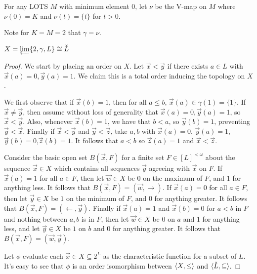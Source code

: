 \documentclass[11pt]{article}
\newcommand{\vect}{\vec}
\begin{document}
  \begin{definition}
    For any LOTS \(M\) with minimum element \(0\),
    let \(\nu\) be the V-map on \(M\) where \(\nu(0)=K\) and \(\nu(t)=\{t\}\)
    for \(t>0\).
  \end{definition}

  Note for \(K=M=2\) that \(\gamma=\nu\).

  \begin{theorem}
    \(X=\varprojlim \{2, \gamma, L\}\cong \check L\)
  \end{theorem}

  \begin{proof}
    We start by placing an order on \(X\). Let \(\vect x<\vect y\) if
    there exists \(a\in L\) with \(\vect x(a)=0,\vect y(a)=1\). We claim this is
    a total order inducing the topology on \(X\).

    We first observe that if \(\vect x(b)=1\), then for all \(a\leq b\),
    \(\vect x(a)\in\gamma(1)=\{1\}\). If \(\vect x\not=\vect y\), then assume
    without loss of generality that \(\vect x(a)=0,\vect y(a)=1\), so
    \(\vect x<\vect y\). Also, whenever \(\vect x(b)=1\), we have that \(b<a\),
    so \(\vect y(b)=1\), preventing \(\vect y<\vect x\). Finally if
    \(\vect x<\vect y\) and \(\vect y<\vect z\), take \(a,b\) with
    \(\vect x(a)=0\), \(\vect y(a)=1\),\(\vect y(b)=0\),\(\vect z(b)=1\). It
    follows that \(a<b\) so \(\vect z(a)=1\) and \(\vect x<\vect z\).

    Consider the basic open set \(B(\vect x,F)\) for a finite set
    \(F\in [L]^{<\omega}\)
    about the sequence \(\vect x\in X\) which contains all sequences
    \(\vect y\) agreeing with \(\vect x\) on \(F\). If \(\vect x(a)=1\) for all
    \(a\in F\), then let \(\vect w\in X\) be \(0\) on the maximum of \(F\),
    and \(1\) for anything less. It follows that
    \(B(\vect x,F)=(\vect w,\rightarrow)\). If \(\vect x(a)=0\) for all
    \(a\in F\), then let \(\vect y\in X\) be \(1\) on the minimum of \(F\),
    and \(0\) for anything greater. It follows that
    \(B(\vect x,F)=(\leftarrow,\vect y)\). Finally if \(\vect x(a)=1\) and
    \(\vect x(b)=0\) for \(a<b\) in \(F\) and nothing between \(a,b\) is in
    \(F\), then let \(\vect w\in X\) be \(0\) on \(a\)
    and \(1\) for anything less, and let \(\vect y\in X\) be \(1\) on \(b\)
    and \(0\) for anything greater. It follows that
    \(B(\vect x,F)=(\vect w,\vect y)\).

    Let \(\phi\) evaluate each \(\vect x\in X\subseteq 2^L\) as the
    characteristic function for a subset of \(L\). It's easy to see that
    \(\phi\) is an order isomorphism between \(\langle X,\leq\rangle\) and
    \(\langle\check L,\subseteq\rangle\).
  \end{proof}
\end{document}
